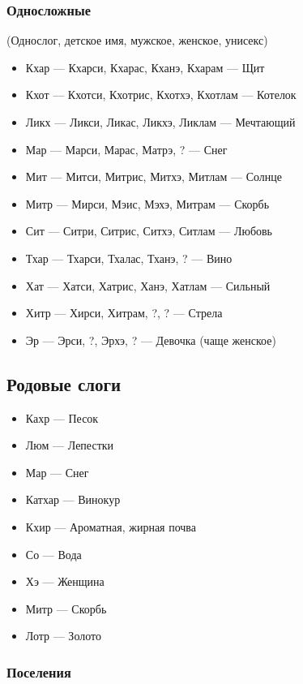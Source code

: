 \documentclass[a4paper,12pt,fleqn]{book}\usepackage{cooltooltips}\usepackage{polyglossia}\setdefaultlanguage[babelshorthands=true]{russian}\setotherlanguage{english}\defaultfontfeatures{Ligatures=TeX,Mapping=tex-text} \usepackage{xcolor}\definecolor{lightgray}{HTML}{bbbbbb}\color{lightgray}\newcommand{\ml}[3]{\textenglish{\textcolor{black}{#3}}}
\begin{document}
{\subsubsection{Односложные}

(Однослог, детское имя, мужское, женское, унисекс)

\begin{itemize}
\item Кхар --- Кхарси, Кхарас, Кханэ, Кхарам --- Щит
\item Кхот --- Кхотси, Кхотрис, Кхотхэ, Кхотлам --- Котелок
\item Ликх --- Ликси, Ликас, Ликхэ, Ликлам --- Мечтающий
\item Мар --- Марси, Марас, Матрэ, ? --- Снег
\item Мит --- Митси, Митрис, Митхэ, Митлам --- Солнце
\item Митр --- Мирси, Мэис, Мэхэ, Митрам --- Скорбь
\item Сит --- Ситри, Ситрис, Ситхэ, Ситлам --- Любовь
\item Тхар --- Тхарси, Тхалас, Тханэ, ? --- Вино
\item Хат --- Хатси, Хатрис, Ханэ, Хатлам --- Сильный
\item Хитр --- Хирси, Хитрам, ?, ? --- Стрела
\item Эр --- Эрси, ?, Эрхэ, ? --- Девочка (чаще женское)
\end{itemize}

\subsection{Родовые слоги}

\begin{itemize}
\item Кахр --- Песок
\item Люм --- Лепестки
\item Мар --- Снег
\item Катхар --- Винокур
\item Кхир --- Ароматная, жирная почва
\item Со --- Вода
\item Хэ --- Женщина
\item Митр --- Скорбь
\item Лотр --- Золото
\end{itemize}

\subsubsection{Поселения}

}
\end{document}
